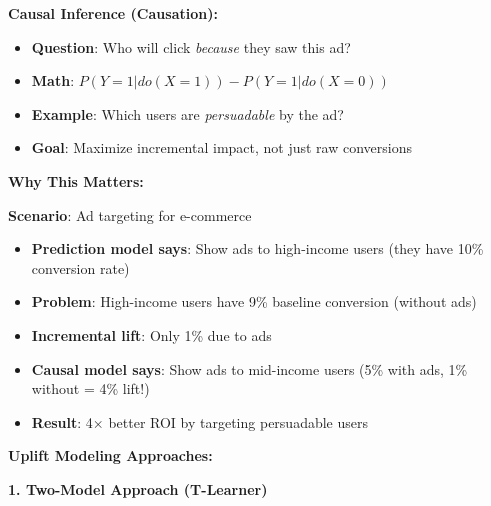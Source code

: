 \documentclass[10pt]{article}
\begin{document}
\textbf{Causal Inference (Causation):}
\begin{itemize}
\item \textbf{Question}: Who will click \textit{because} they saw this ad?
\item \textbf{Math}: $P(Y = 1 | do(X = 1)) - P(Y = 1 | do(X = 0))$
\item \textbf{Example}: Which users are \textit{persuadable} by the ad?
\item \textbf{Goal}: Maximize incremental impact, not just raw conversions
\end{itemize}

\textbf{Why This Matters:}

\textbf{Scenario}: Ad targeting for e-commerce
\begin{itemize}
\item \textbf{Prediction model says}: Show ads to high-income users (they have 10\% conversion rate)
\item \textbf{Problem}: High-income users have 9\% baseline conversion (without ads)
\item \textbf{Incremental lift}: Only 1\% due to ads
\item \textbf{Causal model says}: Show ads to mid-income users (5\% with ads, 1\% without = 4\% lift!)
\item \textbf{Result}: 4× better ROI by targeting persuadable users
\end{itemize}

\textbf{Uplift Modeling Approaches:}

\textbf{1. Two-Model Approach (T-Learner)}
\end{document}
